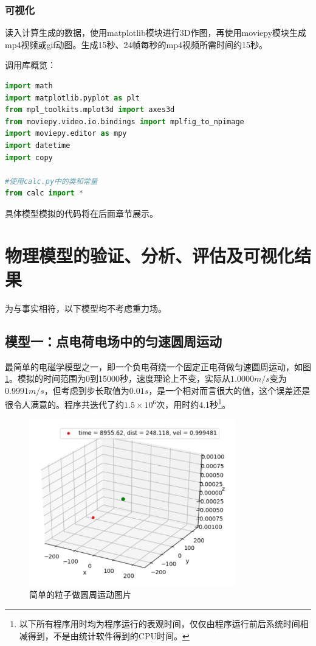 \documentclass[UTF-8,cs4size]{ctexart}
\begin{document}
\subsubsection{可视化}
读入计算生成的数据，使用matplotlib模块进行3D作图，再使用moviepy模块生成mp4视频或gif动图。生成15秒、24帧每秒的mp4视频所需时间约15秒。


调用库概览：
\begin{lstlisting}[language=Python]
import math
import matplotlib.pyplot as plt
from mpl_toolkits.mplot3d import axes3d
from moviepy.video.io.bindings import mplfig_to_npimage
import moviepy.editor as mpy
import datetime
import copy

#使用calc.py中的类和常量
from calc import *
\end{lstlisting}


具体模型模拟的代码将在后面章节展示。
\section{物理模型的验证、分析、评估及可视化结果}
为与事实相符，以下模型均不考虑重力场。
\subsection{模型一：点电荷电场中的匀速圆周运动}
最简单的电磁学模型之一，即一个负电荷绕一个固定正电荷做匀速圆周运动，如图\ref{fig:cir}。模拟的时间范围为0到15000秒，速度理论上不变，实际从$1.0000m/s$变为$0.9991m/s$，但考虑到步长取值为$0.01s$，是一个相对而言很大的值，这个误差还是很令人满意的。程序共迭代了约$1.5\times10^6$次，用时约4.1秒\footnote{以下所有程序用时均为程序运行的表观时间，仅仅由程序运行前后系统时间相减得到，不是由统计软件得到的CPU时间。}。
\begin{figure}[ht!]
	\centering
	\includegraphics[width=9cm]{cir.png}
	\caption{简单的粒子做圆周运动图片}
	\label{fig:cir}
\end{figure}
\end{document}
